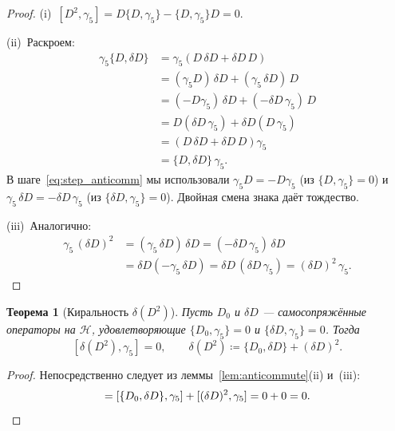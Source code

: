 \documentclass[12pt,a4paper]{article}
\newtheorem{theorem}{Теорема}[section]
\theoremstyle{definition}
\theoremstyle{remark}
\newcommand{\Hilb}{\mathcal{H}}
\begin{document}
\begin{proof}
(i)~$[D^2, \gamma_5] = D\{D, \gamma_5\} - \{D, \gamma_5\}D = 0$.

\medskip\noindent
(ii)~Раскроем:
\begin{align}
  \gamma_5 \{D, \delta D\}
  &= \gamma_5(D\,\delta D + \delta D\, D) \nonumber \\
  &= (\gamma_5 D)\,\delta D + (\gamma_5\,\delta D)\,D \nonumber \\
  &= (-D\gamma_5)\,\delta D + (-\delta D\,\gamma_5)\, D
    \label{eq:step_anticomm}\\
  &= D(\delta D\,\gamma_5) + \delta D(D\,\gamma_5)  \nonumber \\
  &= (D\,\delta D + \delta D\, D)\gamma_5 \nonumber \\
  &= \{D, \delta D\}\,\gamma_5. \nonumber
\end{align}
В шаге~\eqref{eq:step_anticomm} мы использовали
$\gamma_5 D = -D\gamma_5$ (из $\{D, \gamma_5\} = 0$) и
$\gamma_5\,\delta D = -\delta D\,\gamma_5$
(из $\{\delta D, \gamma_5\} = 0$).  Двойная смена знака даёт
тождество.

\medskip\noindent
(iii)~Аналогично:
\begin{align}
  \gamma_5\,(\delta D)^2
  &= (\gamma_5\,\delta D)\,\delta D
  = (-\delta D\,\gamma_5)\,\delta D \nonumber \\
  &= \delta D(-\gamma_5\,\delta D)
  = \delta D\,(\delta D\,\gamma_5)
  = (\delta D)^2\,\gamma_5. \nonumber
\end{align}
\end{proof}

\begin{theorem}[Киральность $\delta(D^2)$]\label{thm:chirality_deltaD2}
Пусть $D_0$ и $\delta D$ --- самосопряжённые операторы на $\Hilb$,
удовлетворяющие $\{D_0, \gamma_5\} = 0$ и
$\{\delta D, \gamma_5\} = 0$.  Тогда
\begin{equation}\label{eq:main_identity}
  [\delta(D^2), \gamma_5] = 0, \qquad
  \delta(D^2) \coloneqq \{D_0, \delta D\} + (\delta D)^2.
\end{equation}
\end{theorem}

\begin{proof}
Непосредственно следует из леммы~\ref{lem:anticommute}(ii) и~(iii):
\begin{equation}
  [\delta(D^2), \gamma_5]
  = [\{D_0, \delta D\}, \gamma_5] + [(\delta D)^2, \gamma_5]
  = 0 + 0 = 0. \qedhere
\end{equation}
\end{proof}
\end{document}
